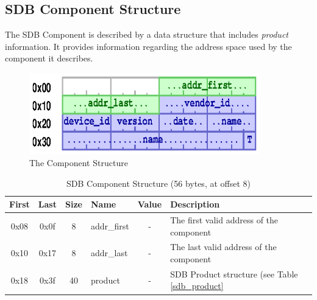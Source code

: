 \documentclass[a4paper, 12pt]{article}
\begin{document}
\subsection{SDB Component Structure}

The SDB Component is described by a data structure that includes \textit{product}
information. It provides information regarding the address space used by the
component it describes.

\begin{figure}[h]
\centering%
\includegraphics[width=100mm]{img/sdb-component.ps}
\caption{The Component Structure}
\label{fig:FigureComponent}
\end{figure}

\begin{center}
  \begin{savenotes}
    \begin{table}[!ht]\footnotesize
      \caption{SDB Component Structure (56 bytes, at offset 8)}\label{sdb_component}\centering
        \begin{tabular}{| c | c | c | l | c | p{5cm} |} \hline
        First & Last & Size & Name & Value & Description \\ \hline
        0x08 & 0x0f & 8 & addr\_first & - & The first valid address of the component \\ \hline
        0x10 & 0x17 & 8 & addr\_last & - & The last valid address of the component \\ \hline
        0x18 & 0x3f & 40 & product & - & SDB Product structure (see Table \ref{sdb_product} \\ \hline
        \end{tabular}
    \end{table}
  \end{savenotes}
\end{center}
\end{document}
